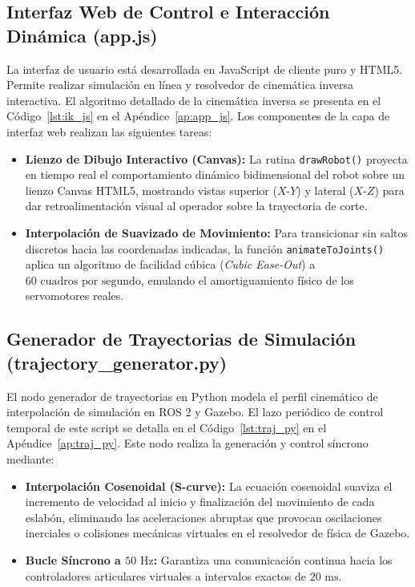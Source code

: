 \documentclass[conference,a4paper]{IEEEtran}
\begin{document}
\subsection{Interfaz Web de Control e Interacción Dinámica (app.js)}
La interfaz de usuario está desarrollada en JavaScript de cliente puro y HTML5. Permite realizar simulación en línea y resolvedor de cinemática inversa interactiva. El algoritmo detallado de la cinemática inversa se presenta en el Código~\ref{lst:ik_js} en el Apéndice~\ref{ap:app_js}.
Los componentes de la capa de interfaz web realizan las siguientes tareas:
\begin{itemize}
    \item \textbf{Lienzo de Dibujo Interactivo (Canvas):} La rutina \texttt{drawRobot()} proyecta en tiempo real el comportamiento dinámico bidimensional del robot sobre un lienzo Canvas HTML5, mostrando vistas superior ($X$-$Y$) y lateral ($X$-$Z$) para dar retroalimentación visual al operador sobre la trayectoria de corte.
    \item \textbf{Interpolación de Suavizado de Movimiento:} Para transicionar sin saltos discretos hacia las coordenadas indicadas, la función \texttt{animateToJoints()} aplica un algoritmo de facilidad cúbica (\textit{Cubic Ease-Out}) a $60\text{ cuadros por segundo}$, emulando el amortiguamiento físico de los servomotores reales.
\end{itemize}

\subsection{Generador de Trayectorias de Simulación (trajectory\_generator.py)}
El nodo generador de trayectorias en Python modela el perfil cinemático de interpolación de simulación en ROS 2 y Gazebo. El lazo periódico de control temporal de este script se detalla en el Código~\ref{lst:traj_py} en el Apéndice~\ref{ap:traj_py}.
Este nodo realiza la generación y control síncrono mediante:
\begin{itemize}
    \item \textbf{Interpolación Cosenoidal (S-curve):} La ecuación cosenoidal suaviza el incremento de velocidad al inicio y finalización del movimiento de cada eslabón, eliminando las aceleraciones abruptas que provocan oscilaciones inerciales o colisiones mecánicas virtuales en el resolvedor de física de Gazebo.
    \item \textbf{Bucle Síncrono a $50\text{ Hz}$:} Garantiza una comunicación continua hacia los controladores articulares virtuales a intervalos exactos de $20\text{ ms}$.
\end{itemize}
\end{document}
